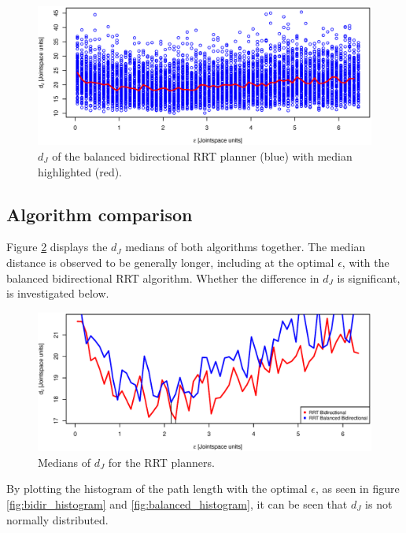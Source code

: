 \begin{figure}[h]
 \centering
 \includegraphics[width=\figsize]{graphics/balanced_correlation}
 \caption{\(d_J\) of the balanced bidirectional RRT planner (blue) with median highlighted (red).}
 \label{fig:balanced_correlated}
\end{figure}


\subsection{Algorithm comparison}
Figure \ref{fig:medians} displays the \(d_J\) medians of both algorithms
together.
The median distance is observed to be generally longer,
including at the optimal \(\epsilon\), with the balanced bidirectional RRT algorithm.
Whether the difference in \(d_J\) is significant, is investigated below.
\begin{figure}[H]
 \centering
 \includegraphics[width=\figsize]{graphics/compare_distance}
 \caption{Medians of \(d_J\) for the RRT planners.}
 \label{fig:medians}
\end{figure}

By plotting the histogram of the path length with the optimal \(\epsilon\),
as seen in figure \ref{fig:bidir_histogram} and \ref{fig:balanced_histogram}, 
it can be seen that \(d_J\) is not normally distributed. 

